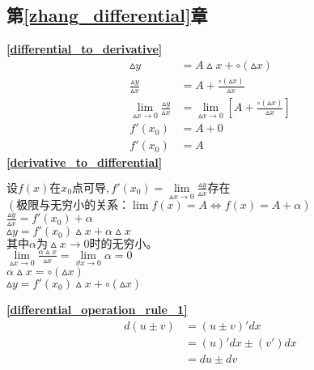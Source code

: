 \subsection{\centering 第\ref{zhang_differential}章}
\textbf{\large \ref{differential_to_derivative}}
\begin{displaymath}
    \begin{split}
            \vartriangle y&=A\vartriangle x+\circ(\vartriangle x)\\
            \frac{\vartriangle y}{\vartriangle x}&=A+\frac{\circ(\vartriangle x)}{\vartriangle x}\\
            \lim\limits_{\vartriangle x\to 0}\frac{\vartriangle y}{\vartriangle x}&=\lim\limits_{\vartriangle x\to 0}\left[A+\frac{\circ(\vartriangle x)}{\vartriangle x}\right]\\
            f'(x_0)&=A+0\\
            f'(x_0)&=A
        \end{split}
\end{displaymath}
\textbf{\large \ref{derivative_to_differential}}
\begin{center}
            $\mbox{设}f(x)\mbox{在}x_0\mbox{点可导},f'(x_0)=\lim\limits_{\vartriangle x \to 0}\frac{\vartriangle y}{\vartriangle x}\mbox{存在}$\\
            $\left(\mbox{极限与无穷小的关系：}\lim f(x)=A\Leftrightarrow f(x)=A+\alpha\right)$\\
            $\frac{\vartriangle y}{\vartriangle x}=f'(x_0)+\alpha$\\
            $\vartriangle y=f'(x_0)\vartriangle x+\alpha \vartriangle x$\\
            $\mbox{其中}\alpha \mbox{为}\vartriangle x\to 0\mbox{时的无穷小。}$\\
            $\lim\limits_{\vartriangle x\to 0}\frac{\alpha \vartriangle x}{\vartriangle x}=\lim\limits_{\vartheta x\to 0}\alpha = 0$\\
            $\alpha \vartriangle x=\circ(\vartriangle x)$\\
            $\vartriangle y=f'(x_0)\vartriangle x+\circ(\vartriangle x)$
\end{center}

\textbf{\large \ref{differential_operation_rule_1}}
\begin{displaymath}
    \begin{split}
        d(u\pm v)&=(u\pm v)'dx\\
                &=(u)'dx \pm (v')dx\\
                &=du\pm dv
    \end{split}
\end{displaymath}

